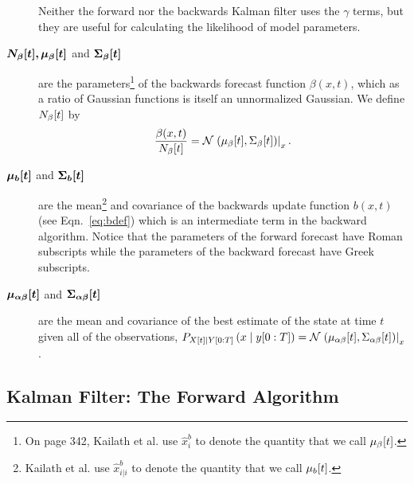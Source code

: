 \begin{description}
  Neither the forward nor the backwards Kalman filter uses the $\gamma$
  terms, but they are useful for calculating the likelihood of model
  parameters.
\item[$\bm{{N_\beta}{[t]},{\mu_\beta}{[t]}}$ and
  $\bm{{\Sigma_\beta}{[t]}}$] are the parameters\footnote{On page
    342, Kailath et al.\cite{KSH00} use $\hat x_i^b$ to denote the
    quantity that we call ${\mu_\beta}{[t]}$.} of the
  backwards forecast function $\beta(x,t)$, which as a ratio of
  Gaussian functions is itself an unnormalized Gaussian.  We define
  ${N_\beta}{[t]}$ by
  \begin{equation*}
    \frac{\beta(x,t)}{{N_\beta}{[t]}} =
    {\mathcal{N}}\left.\left({\mu_\beta}{[t]},{\Sigma_\beta}{[t]}\right)\right|_{x}.
  \end{equation*}
\item[$\bm{{\mu_b}{[t]}}$ and $\bm{{\Sigma_b}{[t]}}$] are the
  mean\footnote{Kailath et al.\cite{KSH00} use $\hat x_{i|i}^b$ to
    denote the quantity that we call ${\mu_b}{[t]}$.} and covariance
  of the backwards update function $b(x,t)$ (see Eqn.~\eqref{eq:bdef})
  which is an intermediate term in the backward algorithm.  Notice
  that the parameters of the forward forecast have Roman subscripts
  while the parameters of the backward forecast have Greek subscripts.
\item[$\bm{{\mu_{\alpha\beta}}{[t]}}$ and
  $\bm{{\Sigma_{\alpha\beta}}{[t]}}$] are the mean and covariance
  of the best estimate of the state at time $t$ given all of the
  observations, \ie $P_{{X}{[t]}\mid Y[0:T]} \left(x\mid y[0:T]
  \right) =
  {\mathcal{N}}\left.\left({\mu_{\alpha\beta}}{[t]},{\Sigma_{\alpha\beta}}{[t]}\right)\right|_{x}$.
\end{description}


\subsection{Kalman Filter: The Forward Algorithm}


